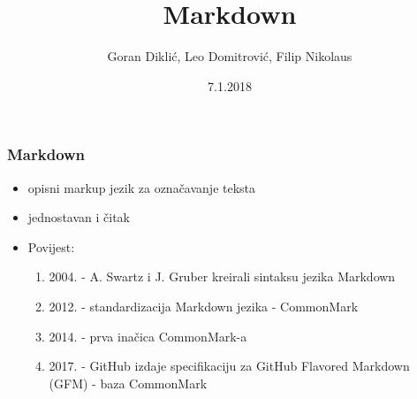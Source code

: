 \documentclass{beamer}
\title{Markdown}
\author{Goran Diklić, Leo Domitrović, Filip Nikolaus}
\date{7.1.2018}
\begin{document}
\maketitle

\newpage

\begin{frame}
\frametitle{Markdown}

\begin{itemize}
\item opisni markup jezik za označavanje teksta
\item jednostavan i čitak
\item Povijest:
\begin{enumerate}
\item 2004. - A. Swartz i J. Gruber kreirali sintaksu jezika Markdown
\item 2012. - standardizacija Markdown jezika - CommonMark
\item 2014. - prva inačica CommonMark-a
\item 2017. - GitHub izdaje specifikaciju za GitHub Flavored Markdown
(GFM) - baza CommonMark
\end{enumerate}

	
\end{itemize}
\end{frame}
\end{document}
